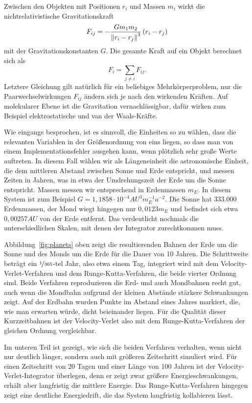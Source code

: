 Zwischen den Objekten mit Positionen $r_i$ und Massen $m_i$ wirkt die
nichtrelativistische Gravitationskraft
\begin{equation}
  F_{ij} = -\frac{G m_1 m_2}{\left\lVert{r_i - r_j}\right\rVert^3}\left(r_i - r_j\right)
\end{equation}
mit der Gravitationskonstanten $G$. Die gesamte Kraft auf ein Objekt
berechnet sich als
\begin{equation}
  F_{i} = \sum_{j\neq i} F_{ij}.
\end{equation}
Letztere Gleichung gilt natürlich für ein beliebiges
Mehrkörperproblem, nur die Paarwechselwirkungen $F_{ij}$ ändern sich
je nach den wirkenden Kräften. Auf molekularer Ebene ist die
Gravitation vernachlässigbar, dafür wirken zum Beispiel
elektrostatische und van der Waals-Kräfte.

Wie eingangs besprochen, ist es sinnvoll, die Einheiten so zu wählen,
dass die relevanten Variablen in der Größenordnung von eins liegen, so
dass man von einem Implementationsfehler ausgehen kann, wenn plötzlich
sehr große Werte auftreten. In diesem Fall wählen wir als
Längeneinheit die astronomische Einheit, die dem mittleren Abstand
zwischen Sonne und Erde entspricht, und messen Zeiten in Jahren, was
in etwa der Umdrehungszeit der Erde um die Sonne entspricht. Massen
messen wir entsprechend in Erdenmassen $m_E$. In diesem System ist zum
Beispiel $G=1,1858\cdot 10^{-4} AU^3 m_E^{-1} a^{-2}$. Die Sonne hat
$333.000$ Erdenmassen, der Mond wiegt hingegen nur $0,0123m_E$ und
befindet sich etwa $0,00257AU$ von der Erde entfernt. Das verdeutlicht
nochmals die unterschiedlichen Skalen, mit denen der Integrator
zurechtkommen muss.

Abbildung~\ref{fig:planets} oben zeigt die resultierenden Bahnen der
Erde um die Sonne und des Monds um die Erde für die Dauer von 10
Jahren. Die Schrittweite beträgt ein $\nicefrac{1}{365}$-tel Jahr,
also etwa einem Tag, integriert wird mit dem Velocity-Verlet-Verfahren
und dem Runge-Kutta-Verfahren, die beide vierter Ordnung sind. Beide
Verfahren reproduzieren die Erd- und auch Mondbahnen recht gut, auch
wenn die Mondbahn aufgrund der kleinen Abstände stärkere Schwankungen
zeigt. Auf der Erdbahn wurden Punkte im Abstand eines Jahres markiert,
die, wie man erwarten würde, dicht beieinander liegen. Für die
Qualität dieser Kurzzeitbahnen ist der Velocity-Verlet also mit dem
Runge-Kutta-Verfahren der gleichen Ordnung vergleichbar.

Im unteren Teil ist gezeigt, wie sich die beiden Verfahren verhalten,
wenn nicht nur deutlich länger, sondern auch mit größeren Zeitschritt
simuliert wird. Für einen Zeitschritt von 20 Tagen und einer Länge
von 100 Jahren ist der Velocity-Verlet-Integrator
überlegen, denn er zeigt zwar größere Energieschwankungen, erhält aber
langfristig die mittlere Energie. Das Runge-Kutta-Verfahren hingegen
zeigt eine deutliche Energiedrift, die das System langfristig
kollabieren lässt.

